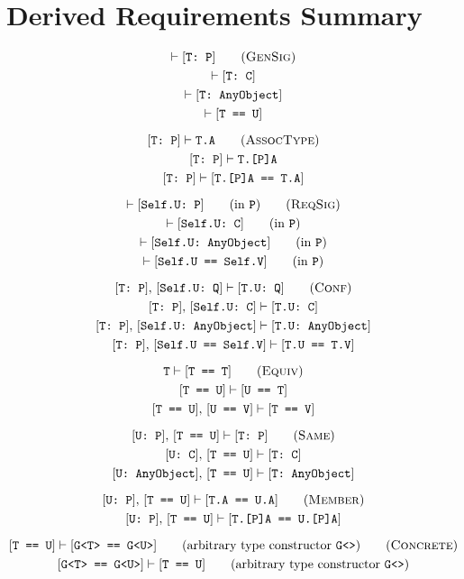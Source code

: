 \documentclass[../generics]{subfiles}
\begin{document}
\chapter{Derived Requirements Summary}\label{derived summary}

\index{$\vdash$}

\begin{gather*}
\vdash\ConfReq{T}{P}\tag{\textsc{GenSig}}\\
\vdash\ConfReq{T}{C}\\
\vdash\ConfReq{T}{AnyObject}\\
\vdash\FormalReq{T == U}\\[\medskipamount]
\ConfReq{T}{P}\vdash\texttt{T.A}\tag{\textsc{AssocType}}\\
\ConfReq{T}{P}\vdash\texttt{T.[P]A}\\
\ConfReq{T}{P}\vdash\FormalReq{T.[P]A == T.A}\\[\medskipamount]
\vdash\ConfReq{Self.U}{P}\qquad\mbox{(in \texttt{P})}\tag{\textsc{ReqSig}}\\
\vdash\ConfReq{Self.U}{C}\qquad\mbox{(in \texttt{P})}\\
\vdash\ConfReq{Self.U}{AnyObject}\qquad\mbox{(in \texttt{P})}\\
\vdash\FormalReq{Self.U == Self.V}\qquad\mbox{(in \texttt{P})}\\[\medskipamount]
\ConfReq{T}{P},\,\ConfReq{Self.U}{Q}\vdash\ConfReq{T.U}{Q}\tag{\textsc{Conf}}\\
\ConfReq{T}{P},\,\ConfReq{Self.U}{C}\vdash\ConfReq{T.U}{C}\\
\ConfReq{T}{P},\,\ConfReq{Self.U}{AnyObject}\vdash\ConfReq{T.U}{AnyObject}\\
\ConfReq{T}{P},\,\FormalReq{Self.U == Self.V}\vdash\FormalReq{T.U == T.V}\\[\medskipamount]
\texttt{T}\vdash\FormalReq{T == T}\tag{\textsc{Equiv}}\\
\FormalReq{T == U}\vdash\FormalReq{U == T}\\
\FormalReq{T == U},\,\FormalReq{U == V}\vdash\FormalReq{T == V}\\[\medskipamount]
\ConfReq{U}{P},\,\FormalReq{T == U}\vdash\ConfReq{T}{P}\tag{\textsc{Same}}\\
\ConfReq{U}{C},\,\FormalReq{T == U}\vdash\ConfReq{T}{C}\\
\ConfReq{U}{AnyObject},\,\FormalReq{T == U}\vdash\ConfReq{T}{AnyObject}\\[\medskipamount]
\ConfReq{U}{P},\,\FormalReq{T == U}\vdash\FormalReq{T.A == U.A}\tag{\textsc{Member}}\\
\ConfReq{U}{P},\,\FormalReq{T == U}\vdash\FormalReq{T.[P]A == U.[P]A}\\[\medskipamount]
\FormalReq{T == U}\vdash\FormalReq{G<T> == G<U>}\qquad\mbox{(arbitrary type constructor \texttt{G<>})}\tag{\textsc{Concrete}}\\
\FormalReq{G<T> == G<U>}\vdash\FormalReq{T == U}\qquad\mbox{(arbitrary type constructor \texttt{G<>})}
\end{gather*}
\end{document}
